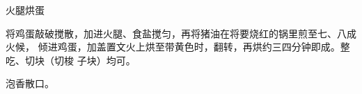 \begin{recipe}{火腿烘蛋}

\ingredients


\preparation

将鸡蛋敲破搅散，加进火腿、食盐搅匀，再将猪油在将要烧红的锅里煎至七、八成火候，
倾进鸡蛋，加盖置文火上烘至带黄色时，翻转，再烘约三四分钟即成。整吃、切块（切梭
子块）均可。

\features

泡香散口。

\end{recipe}

